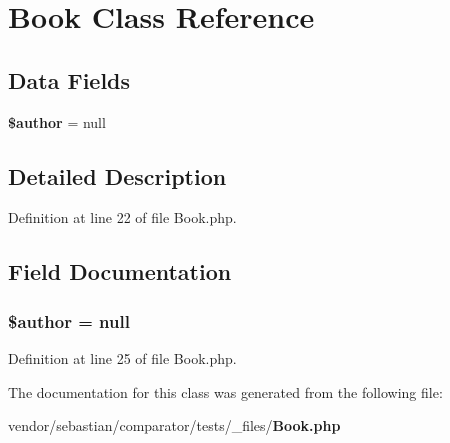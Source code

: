 \section{Book Class Reference}
\label{class_sebastian_bergmann_1_1_comparator_1_1_book}
\subsection*{Data Fields}
\begin{DoxyCompactItemize}
\item 
{\bf \$author} = null
\end{DoxyCompactItemize}


\subsection{Detailed Description}


Definition at line 22 of file Book.\+php.



\subsection{Field Documentation}
\subsubsection[{\$author}]{\setlength{\rightskip}{0pt plus 5cm}\$author = null}\label{class_sebastian_bergmann_1_1_comparator_1_1_book_ac35b828f7d4064a7c9f849c255468ee3}


Definition at line 25 of file Book.\+php.



The documentation for this class was generated from the following file\+:\begin{DoxyCompactItemize}
\item 
vendor/sebastian/comparator/tests/\+\_\+files/{\bf Book.\+php}\end{DoxyCompactItemize}
